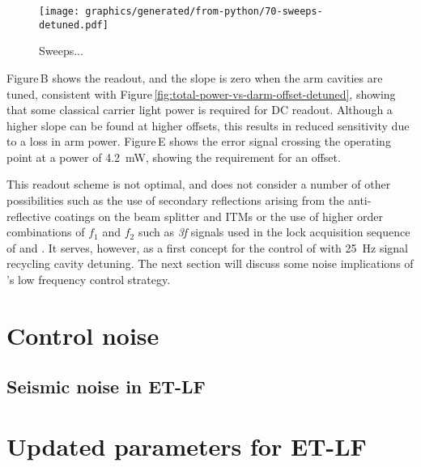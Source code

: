 \begin{figure}
  \centering
  \texttt{[image: graphics/generated/from-python/70-sweeps-detuned.pdf]}
  \caption[Sweeps through the zero-crossings of the chosen error signals in ET-LF]{\label{fig:sweeps-et-lf}Sweeps...}
\end{figure}

Figure\,B shows the \ASDC{} readout, and the slope is zero when the arm cavities are tuned, consistent with Figure\,\ref{fig:total-power-vs-darm-offset-detuned}, showing that some classical carrier light power is required for \gls{DC} readout. Although a higher slope can be found at higher offsets, this results in reduced sensitivity due to a loss in arm power. Figure\,E shows the error signal crossing the operating point at a power of \SI{4.2}{\milli\watt}, showing the requirement for an offset.

This readout scheme is not optimal, and does not consider a number of other possibilities such as the use of secondary reflections arising from the anti-reflective coatings on the beam splitter and \glspl{ITM} or the use of higher order combinations of $f_1$ and $f_2$ such as \emph{3f} signals used in the lock acquisition sequence of \VIRGO{} \cite{Acernese2008} and \ALIGO{} \cite{Staley2014}. It serves, however, as a first concept for the control of \ETLF{} with \SI{25}{\hertz} signal recycling cavity detuning. The next section will discuss some noise implications of \ETLF{}'s low frequency control strategy.

\section{Control noise}

\subsection{Seismic noise in ET-LF}

\section{Updated parameters for ET-LF}

